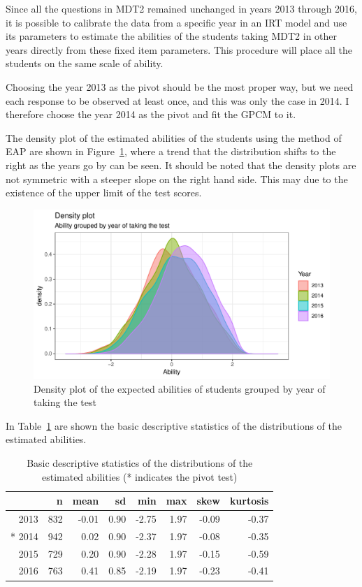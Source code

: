 \documentclass[a4paper]{report}
\begin{document}
Since all the questions in MDT2 remained unchanged in years 2013 through 2016, it is possible to calibrate the data from a specific year in an IRT model and use its parameters to estimate the abilities of the students taking MDT2 in other years directly from these fixed item parameters. This procedure will place all the students on the same scale of ability. 

Choosing the year 2013 as the pivot should be the most proper way, but we need each response to be observed at least once, and this was only the case in 2014. I therefore choose the year 2014 as the pivot and fit the GPCM to it. 

The density plot of the estimated abilities of the students using the method of EAP \cite{irtequating} are shown in Figure~\ref{fig:GRTH_density}, where a trend that the distribution shifts to the right as the years go by can be seen. It should be noted that the density plots are not symmetric with a steeper slope on the right hand side. This may due to the existence of the upper limit of the test scores. 

\begin{figure}[H]
  \centering
  \includegraphics[width=\linewidth]{fig/GRTH_density.pdf}
  \caption{\label{fig:GRTH_density}Density plot of the expected abilities of students grouped by year of taking the test}
\end{figure}

In Table~\ref{tab:GRTH_dsc} are shown the basic descriptive statistics of the distributions of the estimated abilities. 

\begin{table}[ht]
  \centering
  \begin{tabular}{rrrrrrrr}
    \hline
   & n & mean & sd & min & max & skew & kurtosis \\ 
    \hline
  2013 & 832 & -0.01 & 0.90 & -2.75 & 1.97 & -0.09 & -0.37 \\ 
    * 2014 & 942 & 0.02 & 0.90 & -2.37 & 1.97 & -0.08 & -0.35 \\ 
    2015 & 729 & 0.20 & 0.90 & -2.28 & 1.97 & -0.15 & -0.59 \\ 
    2016 & 763 & 0.41 & 0.85 & -2.19 & 1.97 & -0.23 & -0.41 \\ 
     \hline
  \end{tabular}
  \caption{\label{tab:GRTH_dsc}Basic descriptive statistics of the distributions of the estimated abilities (* indicates the pivot test)}
\end{table}
\end{document}
